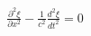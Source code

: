 \documentclass[preview]{standalone}
\begin{document}
\begin{align*}
\frac{\partial^2 \xi}{\partial x^2} - \frac{1}{c^2}\frac{d^2 \xi}{dt^2}  = 0
\end{align*}
\end{document}
